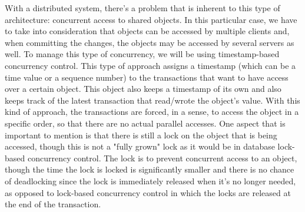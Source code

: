 \documentclass[times, 10pt,twocolumn]{article}
\begin{document}
With a distributed system, there's a problem that is inherent to this type of architecture: concurrent access to shared objects. In this particular case, we have to take into consideration that objects can be accessed by multiple clients and, when committing the changes, the objects may be accessed by several servers as well.
To manage this type of concurrency, we will be using timestamp-based concurrency control. This type of approach assigns a timestamp (which can be a time value or a sequence number) to the transactions that want to have access over a certain object. This object also keeps a timestamp of its own and also keeps track of the latest transaction that read/wrote the object's value. With this kind of approach, the transactions are forced, in a sense, to access the object in a specific order, so that there are no actual parallel accesses.
One aspect that is important to mention is that there is still a lock on the object that is being accessed, though this is not a "fully grown" lock as it would be in database lock-based concurrency control. The lock is to prevent concurrent access to an object, though the time the lock is locked is significantly smaller and there is no chance of deadlocking since the lock is immediately released when it's no longer needed, as opposed to lock-based concurrency control in which the locks are released at the end of the transaction.

\end{document}
